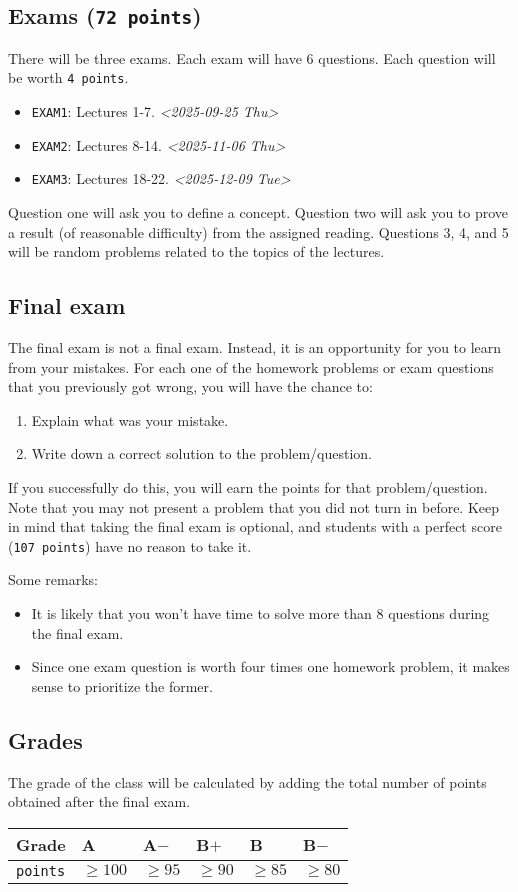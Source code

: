 \documentclass[11pt]{article}
\begin{document}
\subsection{Exams (\texttt{72 points})}
\label{sec:orgc2ab170}
There will be three exams. Each exam will have 6 questions. Each question will
be worth \texttt{4 points}.
\begin{itemize}
\item \texttt{EXAM1}: Lectures 1-7. \textit{<2025-09-25 Thu>}
\item \texttt{EXAM2}: Lectures 8-14. \textit{<2025-11-06 Thu>}
\item \texttt{EXAM3}: Lectures 18-22. \textit{<2025-12-09 Tue>}
\end{itemize}
Question one will ask you to define a concept. Question two will ask you to
prove a result (of reasonable difficulty) from the assigned reading. Questions
3, 4, and 5 will be random problems related to the topics of the lectures.
\subsection{Final exam}
\label{sec:org0129372}
The final exam is not a final exam. Instead, it is an opportunity for you to
learn from your mistakes. For each one of the homework problems or exam
questions that you previously got wrong, you will have the chance to:
\begin{enumerate}
\item Explain what was your mistake.
\item Write down a correct solution to the problem/question.
\end{enumerate}
If you successfully do this, you will earn the points for that problem/question.
Note that you may not present a problem that you did not turn in before. Keep
in mind that taking the final exam is optional, and students with a perfect
score (\texttt{107 points}) have no reason to take it.

Some remarks:
\begin{itemize}
\item It is likely that you won't have time to solve more than 8 questions during
the final exam.
\item Since one exam question is worth four times one homework problem, it makes
sense to prioritize the former.
\end{itemize}
\subsection{Grades}
\label{sec:orga8b3ca5}
The grade of the class will be calculated by adding the total number of points
obtained after the final exam.
\begin{center}
\begin{tabular}{llllll}
\textbf{Grade} & A & A\(-\) & B\(+\) & B & B\(-\)\\[0pt]
\hline
\texttt{points} & \(\geq 100\) & \(\geq 95\) & \(\geq 90\) & \(\geq 85\) & \(\geq 80\)\\[0pt]
\end{tabular}
\end{center}
\end{document}
